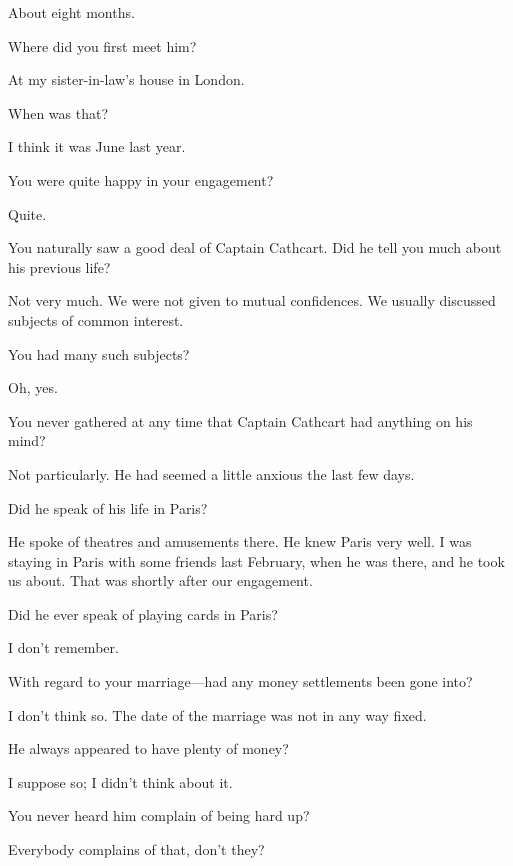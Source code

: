 \begin{dialogue}
 About eight months.

 Where did you first meet him?

 At my sister-in-law's house in London.

 When was that?

 I think it was June last year.

 You were quite happy in your engagement?

 Quite.

 You naturally saw a good deal of Captain Cathcart. Did he tell you much about his previous life?

 Not very much. We were not given to mutual confidences. We usually discussed subjects of common interest.

 You had many such subjects?

 Oh, yes.

 You never gathered at any time that Captain Cathcart had anything on his mind?

 Not particularly. He had seemed a little anxious the last few days.

 Did he speak of his life in Paris?

 He spoke of theatres and amusements there. He knew Paris very well. I was staying in Paris with some friends last February, when he was there, and he took us about. That was shortly after our engagement.

 Did he ever speak of playing cards in Paris?

 I don't remember.

 With regard to your marriage\allowbreak---\allowbreak had any money settlements been gone into?

 I don't think so. The date of the marriage was not in any way fixed.

 He always appeared to have plenty of money?

 I suppose so; I didn't think about it.

 You never heard him complain of being hard up?

 Everybody complains of that, don't they?


\end{dialogue}
